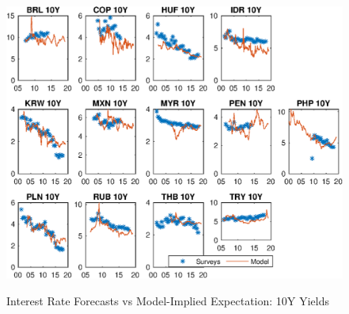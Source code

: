 \documentclass{article}
\begin{document}
\begin{figure}[tbph]
	\begin{center}
		\caption{Interest Rate Forecasts vs Model-Implied Expectation: 10Y Yields}
		\label{fig:svycbp_ssb_yP}
		\includegraphics[trim={0cm 0cm 0cm 0cm},clip,height=1\textheight,width=1.4\textwidth]{../Figures/Estimation/svycbp_ssb_yP.eps} \\
	\end{center}
\end{figure}
\end{document}
